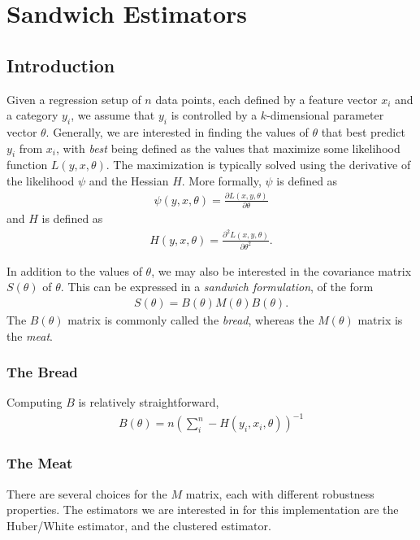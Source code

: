 
\chapter[Sandwich Estimators]{Sandwich Estimators}


\section{Introduction}
Given a regression setup of $n$ data points, each defined by a feature  vector $x_i$ and a category $y_i$, we assume that $y_i$ is controlled by a $k$-dimensional parameter vector $\theta$.  Generally, we are interested in finding the values of $\theta$ that best predict $y_i$ from $x_i$, with \textit{best} being defined as the values that maximize some likelihood function $L(y,x,\theta)$.  The maximization is typically solved using the derivative of the likelihood $\psi$  and the Hessian $H$.  More formally, $\psi$ is defined as 
\begin{align}
\psi(y,x, \theta) = \frac{\partial L(x,y,\theta)}{\partial \theta}
\end{align} 
and $H$ is defined as
\begin{align}
H(y,x, \theta) = \frac{\partial^2 L(x,y,\theta)}{\partial \theta^2}.
\end{align} 



In addition to the values of $\theta$, we may also be interested in the covariance matrix $S(\theta)$ of $\theta$.  This can be expressed in a \textit{sandwich formulation}, of the form
\begin{align}
S(\theta) = B(\theta) M(\theta) B(\theta).  
\end{align}
The $B(\theta)$ matrix is commonly called the \textit{bread}, whereas the $M(\theta)$ matrix is the \textit{meat}.  

\subsection{The Bread}
Computing $B$ is relatively straightforward, 
\begin{align}
B(\theta) = n\left(\sum_i^n -H(y_i, x_i, \theta) \right)^{-1}
\end{align}

\subsection{The Meat}
There are several choices for the $M$ matrix, each with different robustness properties.  The estimators we are interested in for this implementation are the Huber/White estimator, and the clustered estimator.  

